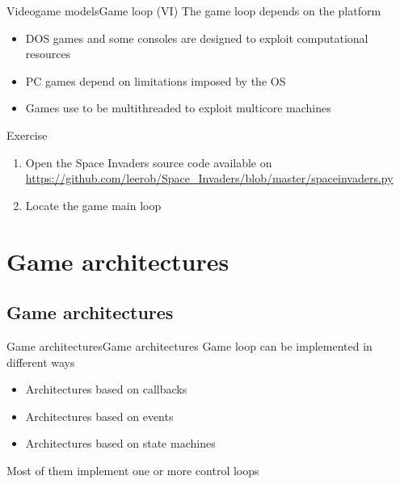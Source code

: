\documentclass[10pt,compress]{beamer} %
\begin{document}
\begin{frame}{Videogame models}{Game loop (VI)}
	    The game loop depends on the platform
		\begin{itemize}
			\item DOS games and some consoles are designed to exploit computational resources
			\item PC games depend on limitations imposed by the OS
			\item Games use to be multithreaded to exploit multicore machines
		\end{itemize}

		\begin{block}{Exercise}
			\begin{enumerate}
			\item Open the Space Invaders source code available on \\
			\url{https://github.com/leerob/Space_Invaders/blob/master/spaceinvaders.py}
			\item Locate the game main loop
			\end{enumerate}
		\end{block}
\end{frame}

\section{Game architectures}
\subsection{Game architectures}

\begin{frame}{Game architectures}{Game architectures}
    Game loop can be implemented in different ways
	\begin{itemize}
		\item Architectures based on callbacks
		\item Architectures based on events
		\item Architectures based on state machines
	\end{itemize}
	Most of them implement one or more control loops
\end{frame}
\end{document}
